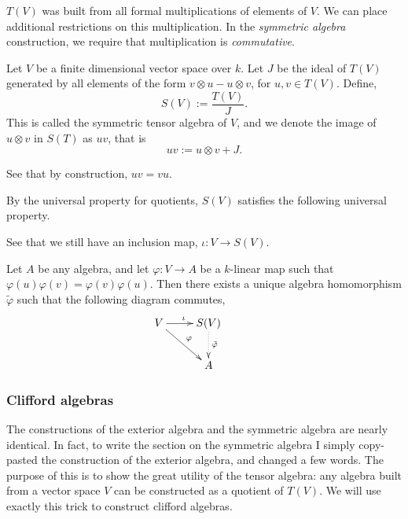 $T(V)$ was built from all formal multiplications of elements of $V$. We 
can place additional restrictions on this multiplication. In the \emph{symmetric algebra}
construction, we require that multiplication is \emph{commutative}.
\begin{definition}
    Let $V$ be a finite dimensional vector space over $k$. 
    Let $J$ be the ideal of $T(V)$ generated by all elements of the form
    $v \otimes u - u\otimes v$, for $u,v \in T(V)$.
    Define,
    \begin{equation*}
        S(V) := \frac{T(V)}{J}.
    \end{equation*}
    This is called the symmetric tensor algebra of $V$, and we denote
    the image of $u \otimes v$ in $S(T)$ as $uv$, that is
    \begin{equation*}
        uv := u \otimes v + J.
    \end{equation*}

    See that by construction, $uv = vu$.
\end{definition}

By the universal property for quotients, $S(V)$ satisfies the following
universal property.
\begin{proposition}
    See that we still have an inclusion map, $\iota:V\rightarrow S(V)$.

    Let $A$ be any algebra, and let $\varphi:V\rightarrow A$
    be a $k$-linear map such that $\varphi(u)\varphi(v) = \varphi(v)\varphi(u)$. Then there exists
    a unique algebra homomorphism $\tilde{\varphi}$ such that the following diagram
    commutes,
    \begin{displaymath}
    \xymatrix{
        V \ar[r]^\iota \ar[rd]^\varphi&
        S(V) \ar@{.>}[d]^{\tilde{\varphi}}&\\
        &
        A
    }
    \end{displaymath}
\end{proposition}

\subsubsection{Clifford algebras}
The constructions of the exterior algebra and the symmetric algebra are nearly
identical. In fact, to write the section on the symmetric algebra I simply
copy-pasted the construction of the exterior algebra, and changed a few words.
The purpose of this is to show the great utility of the tensor algebra: any
algebra built from a vector space $V$ can be constructed as a quotient
of $T(V)$. We will use exactly this trick to construct clifford algebras. 


